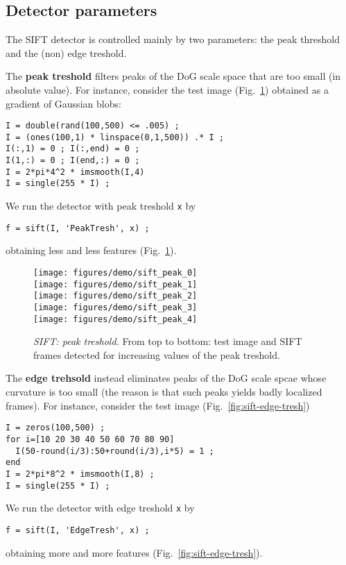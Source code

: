 \documentclass[9.5pt]{article}
\begin{document}
\subsection{Detector parameters}\label{sift.parameters}

The SIFT detector is controlled mainly by two parameters: the peak
threshold and the (non) edge treshold. 

The {\bf peak treshold} filters peaks of the DoG scale space that are
too small (in absolute value). For instance, consider the test image
(Fig.~\ref{fig:sift-peak-tresh}) obtained as a gradient of Gaussian
blobs:
\begin{verbatim}
I = double(rand(100,500) <= .005) ;
I = (ones(100,1) * linspace(0,1,500)) .* I ;
I(:,1) = 0 ; I(:,end) = 0 ;
I(1,:) = 0 ; I(end,:) = 0 ;
I = 2*pi*4^2 * imsmooth(I,4)
I = single(255 * I) ;
\end{verbatim}
We run the detector with peak treshold \verb$x$ by
\begin{verbatim}
f = sift(I, 'PeakTresh', x) ;
\end{verbatim}
obtaining less and less features (Fig.~\ref{fig:sift-peak-tresh}).

\begin{figure}
\begin{center}
\texttt{[image: figures/demo/sift\_peak\_0]}\\
\texttt{[image: figures/demo/sift\_peak\_1]}\\
\texttt{[image: figures/demo/sift\_peak\_2]}\\
\texttt{[image: figures/demo/sift\_peak\_3]}\\
\texttt{[image: figures/demo/sift\_peak\_4]}
\end{center}
\caption{{\em SIFT: peak treshold.} From top to bottom: test image and
  SIFT frames detected for increasing values of the peak treshold.}
\label{fig:sift-peak-tresh}
\end{figure}

The {\bf edge trehsold} instead eliminates peaks of the DoG scale
spcae whose curvature is too small (the reason is that such peaks
yields badly localized frames). For instance, consider the test image
(Fig.~\ref{fig:sift-edge-tresh})
\begin{verbatim}
I = zeros(100,500) ;
for i=[10 20 30 40 50 60 70 80 90]
  I(50-round(i/3):50+round(i/3),i*5) = 1 ;
end
I = 2*pi*8^2 * imsmooth(I,8) ;
I = single(255 * I) ;
\end{verbatim}
We run the detector with edge treshold \verb$x$ by
\begin{verbatim}
f = sift(I, 'EdgeTresh', x) ;
\end{verbatim}
obtaining more and more features (Fig.~\ref{fig:sift-edge-tresh}).
\end{document}
